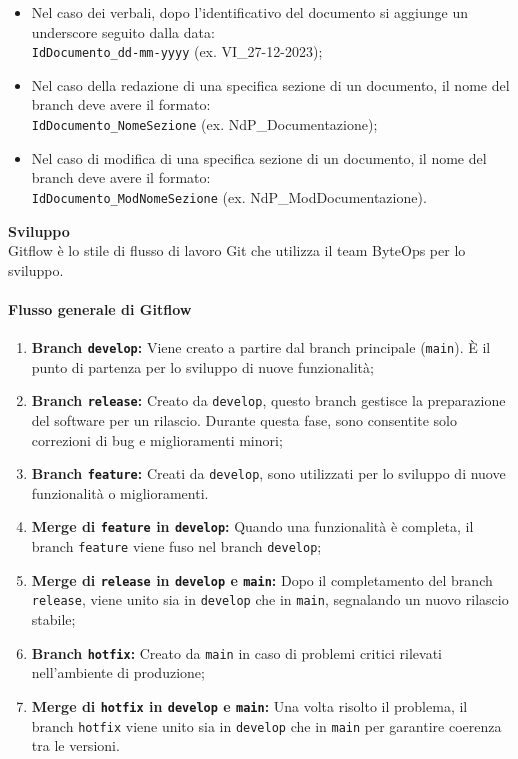 \begin{itemize}
    \item Nel caso dei verbali, dopo l'identificativo del documento si aggiunge un underscore seguito dalla data: \\
    \texttt{IdDocumento\_dd-mm-yyyy} (ex. VI\_27-12-2023);
    \item Nel caso della redazione di una specifica sezione di un documento, il nome del branch deve avere il formato: \\
    \texttt{IdDocumento\_NomeSezione} (ex. NdP\_Documentazione);
    \item Nel caso di modifica di una specifica sezione di un documento, il nome del branch deve avere il formato: \\
    \texttt{IdDocumento\_ModNomeSezione} (ex. NdP\_ModDocumentazione).
\end{itemize}

\textbf{Sviluppo} \\
Gitflow è lo stile di flusso di lavoro Git che utilizza il team ByteOps per lo sviluppo.

\paragraph*{Flusso generale di Gitflow}

\begin{enumerate}
    \item \textbf{Branch \texttt{develop}:} Viene creato a partire dal branch principale (\texttt{main}). È il punto di partenza per lo sviluppo di nuove funzionalità;

    \item \textbf{Branch \texttt{release}:} Creato da \texttt{develop}, questo branch gestisce la preparazione del software per un rilascio. Durante questa fase, sono consentite solo correzioni di bug e miglioramenti minori;

    \item \textbf{Branch \texttt{feature}:} Creati da \texttt{develop}, sono utilizzati per lo sviluppo di nuove funzionalità o miglioramenti. 

    \item \textbf{Merge di \texttt{feature} in \texttt{develop}:} Quando una funzionalità è completa, il branch \texttt{feature} viene fuso nel branch \texttt{develop};

    \item \textbf{Merge di \texttt{release} in \texttt{develop} e \texttt{main}:} Dopo il completamento del branch \texttt{release}, viene unito sia in \texttt{develop} che in \texttt{main}, segnalando un nuovo rilascio stabile;

    \item \textbf{Branch \texttt{hotfix}:} Creato da \texttt{main} in caso di problemi critici rilevati nell'ambiente di produzione;

    \item \textbf{Merge di \texttt{hotfix} in \texttt{develop} e \texttt{main}:} Una volta risolto il problema, il branch \texttt{hotfix} viene unito sia in \texttt{develop} che in \texttt{main} per garantire coerenza tra le versioni.
\end{enumerate}

